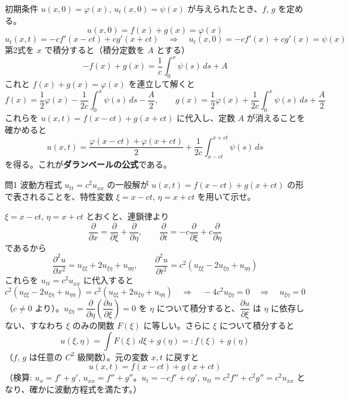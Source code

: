 \documentclass[a4paper,11pt]{article}
\begin{document}
初期条件 $u(x,0) = \varphi(x)$, $u_{t}(x,0) = \psi(x)$ が与えられたとき、$f$, $g$ を定める。
\[
u(x,0) = f(x) + g(x) = \varphi(x)
\]
\[
u_{t}(x,t) = -c f'(x-ct) + c g'(x+ct)
\quad\Longrightarrow\quad
u_{t}(x,0) = -c f'(x) + c g'(x) = \psi(x)
\]
第2式を $x$ で積分すると（積分定数を $A$ とする）
\[
-f(x) + g(x) = \frac{1}{c}\int_{0}^{x} \psi(s)\,ds + A
\]
これと $f(x)+g(x)=\varphi(x)$ を連立して解くと
\[
f(x) = \frac{1}{2}\varphi(x) - \frac{1}{2c}\int_{0}^{x}\psi(s)\,ds - \frac{A}{2},
\qquad
g(x) = \frac{1}{2}\varphi(x) + \frac{1}{2c}\int_{0}^{x}\psi(s)\,ds + \frac{A}{2}
\]
これらを $u(x,t) = f(x-ct) + g(x+ct)$ に代入し、定数 $A$ が消えることを確かめると
\[
u(x,t) = \frac{\varphi(x-ct) + \varphi(x+ct)}{2} + \frac{1}{2c}\int_{x-ct}^{x+ct} \psi(s)\,ds
\]
を得る。これが\textbf{ダランベールの公式}である。

\clearpage
\begin{mondaiboxS}{問1}
波動方程式 $u_{tt} = c^{2}u_{xx}$ の一般解が $u(x,t) = f(x-ct) + g(x+ct)$ の形で表されることを、特性変数 $\xi = x-ct$, $\eta = x+ct$ を用いて示せ。
\end{mondaiboxS}
\kaitou
$\xi = x-ct$, $\eta = x+ct$ とおくと、連鎖律より
\[
\frac{\partial}{\partial x} = \frac{\partial}{\partial \xi} + \frac{\partial}{\partial \eta}, \qquad
\frac{\partial}{\partial t} = -c\frac{\partial}{\partial \xi} + c\frac{\partial}{\partial \eta}
\]
であるから
\[
\frac{\partial^{2} u}{\partial x^{2}} = u_{\xi\xi} + 2u_{\xi\eta} + u_{\eta\eta}, \qquad
\frac{\partial^{2} u}{\partial t^{2}} = c^{2}\left(u_{\xi\xi} - 2u_{\xi\eta} + u_{\eta\eta}\right)
\]
これらを $u_{tt} = c^{2}u_{xx}$ に代入すると
\[
c^{2}\left(u_{\xi\xi} - 2u_{\xi\eta} + u_{\eta\eta}\right) = c^{2}\left(u_{\xi\xi} + 2u_{\xi\eta} + u_{\eta\eta}\right)
\quad\Longrightarrow\quad
-4c^{2}u_{\xi\eta} = 0
\quad\Longrightarrow\quad
u_{\xi\eta} = 0
\]
（$c \neq 0$ より）。$u_{\xi\eta} = \dfrac{\partial}{\partial \eta}\left(\dfrac{\partial u}{\partial \xi}\right) = 0$ を $\eta$ について積分すると、$\dfrac{\partial u}{\partial \xi}$ は $\eta$ に依存しない、すなわち $\xi$ のみの関数 $F(\xi)$ に等しい。さらに $\xi$ について積分すると
\[
u(\xi,\eta) = \int F(\xi)\,d\xi + g(\eta) =: f(\xi) + g(\eta)
\]
（$f$, $g$ は任意の $C^{2}$ 級関数）。元の変数 $x, t$ に戻すと
\[
\boxed{\; u(x,t) = f(x-ct) + g(x+ct) \;}
\]
（検算: $u_x = f' + g'$, $u_{xx} = f'' + g''$。$u_t = -cf' + cg'$, $u_{tt} = c^{2}f'' + c^{2}g'' = c^{2}u_{xx}$ となり、確かに波動方程式を満たす。）
\end{document}
